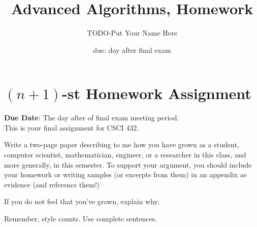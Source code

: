 \documentclass{article}
\title{Advanced Algorithms, Homework \hwnum}
\author{TODO-Put Your Name Here}
\date{due: day after final exam}
\begin{document}
\section*{$(n+1)$-st Homework Assignment}

{\bf{Due Date}}: The day after of final exam meeting period.\\

This is your final assignment for CSCI 432.

Write a two-page paper describing to me how you have grown as a student,
computer scientist, mathematician, engineer, or a researcher in this class, and
more generally, in this semester.  To support your argument, you should include
your homework or writing samples (or excerpts from them) in an appendix as
evidence (and reference them!)

If you do not feel that you've grown, explain why.

Remember, style counts. Use complete sentences.
\end{document}
